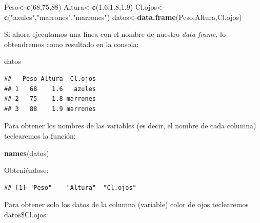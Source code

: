 \documentclass[
]{book}
\newenvironment{Shaded}{\begin{snugshade}}{\end{snugshade}}
\newcommand{\DecValTok}[1]{\textcolor[rgb]{0.00,0.00,0.81}{#1}}
\newcommand{\FloatTok}[1]{\textcolor[rgb]{0.00,0.00,0.81}{#1}}
\newcommand{\FunctionTok}[1]{\textcolor[rgb]{0.13,0.29,0.53}{\textbf{#1}}}
\newcommand{\NormalTok}[1]{#1}
\newcommand{\OtherTok}[1]{\textcolor[rgb]{0.56,0.35,0.01}{#1}}
\newcommand{\SpecialCharTok}[1]{\textcolor[rgb]{0.81,0.36,0.00}{\textbf{#1}}}
\newcommand{\StringTok}[1]{\textcolor[rgb]{0.31,0.60,0.02}{#1}}
\begin{document}
\begin{Shaded}
\begin{Highlighting}[]
\NormalTok{Peso}\OtherTok{\textless{}{-}}\FunctionTok{c}\NormalTok{(}\DecValTok{68}\NormalTok{,}\DecValTok{75}\NormalTok{,}\DecValTok{88}\NormalTok{)}
\NormalTok{Altura}\OtherTok{\textless{}{-}}\FunctionTok{c}\NormalTok{(}\FloatTok{1.6}\NormalTok{,}\FloatTok{1.8}\NormalTok{,}\FloatTok{1.9}\NormalTok{)}
\NormalTok{Cl.ojos}\OtherTok{\textless{}{-}}\FunctionTok{c}\NormalTok{(}\StringTok{"azules"}\NormalTok{,}\StringTok{"marrones"}\NormalTok{,}\StringTok{"marrones"}\NormalTok{)}
\NormalTok{datos}\OtherTok{\textless{}{-}}\FunctionTok{data.frame}\NormalTok{(Peso,Altura,Cl.ojos)}
\end{Highlighting}
\end{Shaded}

Si ahora ejecutamos una línea con el nombre de nuestro \emph{data frame}, lo obtendremos como resultado en la consola:

\begin{Shaded}
\begin{Highlighting}[]
\NormalTok{datos}
\end{Highlighting}
\end{Shaded}

\begin{verbatim}
##   Peso Altura  Cl.ojos
## 1   68    1.6   azules
## 2   75    1.8 marrones
## 3   88    1.9 marrones
\end{verbatim}

Para obtener los nombres de las variables (es decir, el nombre de cada columna) teclearemos la función:

\begin{Shaded}
\begin{Highlighting}[]
\FunctionTok{names}\NormalTok{(datos)}
\end{Highlighting}
\end{Shaded}

Obteniéndose:

\begin{verbatim}
## [1] "Peso"    "Altura"  "Cl.ojos"
\end{verbatim}

Para obtener solo los datos de la columna (variable) color de ojos teclearemos datos\$Cl.ojos:

\begin{Shaded}
\end{Shaded}
\end{document}

